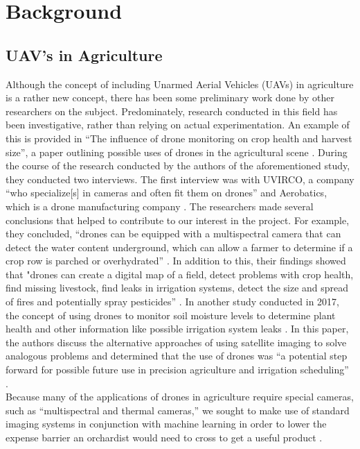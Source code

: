 \section{Background}
\subsection{UAV's in Agriculture}
Although the concept of including Unarmed Aerial Vehicles (UAVs) in agriculture is a rather new concept, there has been some preliminary work done by other researchers on the subject.
Predominately, research conducted in this field has been investigative, rather than relying on actual experimentation.
An example of this is provided in ``The influence of drone monitoring on crop health and harvest size'', a paper outlining possible uses of drones in the agricultural scene \cite{Reinecke2017}.
During the course of the research conducted by the authors of the aforementioned study, they conducted two interviews. 
The first interview was with UVIRCO, a company ``who specialize[s] in cameras and often fit them on drones'' and Aerobatics, which is a drone manufacturing company \cite{Reinecke2017}.
The researchers made several conclusions that helped to contribute to our interest in the project.
For example, they concluded, ``drones can be equipped with a multispectral camera that can detect the water content underground, which can allow a farmer to determine if a crop row is parched or overhydrated'' \cite{Reinecke2017}.
In addition to this, their findings showed that "drones can create a digital map of a field, detect problems with crop health, find missing livestock, find leaks in irrigation systems, detect the size and spread of fires and potentially spray pesticides'' \cite{Reinecke2017}.
In another study conducted in 2017, the concept of using drones to monitor soil moisture levels to determine plant health and other information like possible irrigation system leaks \cite{Hassan2017}. In this paper, the authors discuss the alternative approaches of using satellite imaging to solve analogous problems and determined that the use of drones was ``a potential step forward for possible future use in precision agriculture and irrigation scheduling'' \cite{Hassan2017}.
\\
Because many of the applications of drones in agriculture require special cameras, such as ``multispectral and thermal cameras,'' we sought to make use of standard imaging systems in conjunction with machine learning in order to lower the expense barrier an orchardist would need to cross to get a useful product \cite{Reinecke2017}.